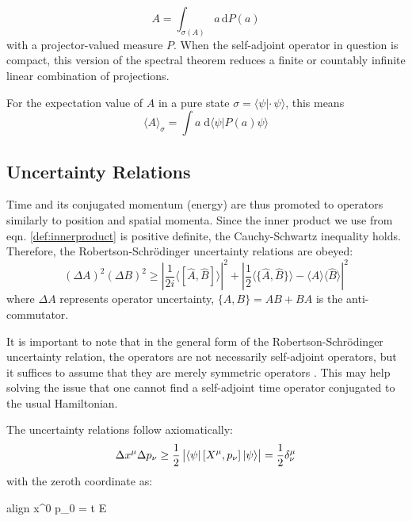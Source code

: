 \documentclass[twoside,a4paper,11pt]{article}
\numberwithin{equation}{section}
\newcommand{\boxedeq}[2]{\begin{empheq}[box={\fboxsep=6pt\fbox}]{align}\label{#1}#2\end{empheq}}
\begin{document}
\begin{equation}
    A = \int_{\sigma(A)} a \, \mathrm{d}P(a)
\end{equation}
with a projector-valued measure $P$. When the self-adjoint operator in question is compact, this version of the spectral theorem reduces a finite or countably infinite linear combination of projections.

For the expectation value of $A$ in a pure state $\sigma=\langle\psi | \cdot \, \psi \rangle$, this means
\begin{equation}
    \langle A \rangle_\sigma = \int a \; \mathrm{d} \langle \psi | P(a) \psi\rangle
\end{equation}
\fi





\subsection{Uncertainty Relations}
\label{sub:TEUR}
Time and its conjugated momentum (energy) are thus promoted to operators similarly to position and spatial momenta. Since the inner product we use from eqn. \ref{def:innerproduct} is positive definite, the Cauchy-Schwartz inequality holds. Therefore, the Robertson-Schr{\"o}dinger uncertainty relations \cite{RobertsonUR} are obeyed:
\begin{equation}
 (\Delta{A})^{2}(\Delta{B})^{2}\geq \left|{\frac {1}{2i}}\langle [{\hat {A}},{\hat {B}}]\rangle \right|^{2} + \left|{\frac {1}{2}}\langle \{{\hat {A}},{\hat {B}}\}\rangle -\langle {\hat {A}}\rangle \langle {\hat {B}}\rangle \right|^{2}
\end{equation}
where $\Delta A$ represents operator uncertainty, $\{A, B\} = AB + BA$ is the anti-commutator.

It is important to note that in the general form of the Robertson-Schr{\"o}dinger uncertainty relation, the operators are not necessarily self-adjoint operators, but it suffices to assume that they are merely symmetric operators \cite{HallUR}. This may help solving the issue that one cannot find a self-adjoint time operator conjugated to the usual Hamiltonian. 

The uncertainty relations follow axiomatically:
\begin{equation}
    \Delta x^{\mu} \Delta p_{\nu} \geq \frac{1}{2} \left|  \bra{\psi} \left[ X^\mu, p_\nu \right] \ket{\psi} \right| = \frac{ 1}{2} \delta_\nu^\mu 
\end{equation}    
with the zeroth coordinate as:
\boxedeq{THERESULT}{
      \Delta x^{0} \Delta p_{0} = \Delta t \Delta E \geq \frac{ 1}{2}
}   
\end{document}

